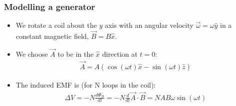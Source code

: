 \documentclass[aspectratio=169,
hyperref={colorlinks,urlcolor=blue}
]{beamer}
\begin{document}




\subsubsection{Modelling a generator}
\label{subsubsec:modellingagenerator}
{
\begin{itemize}
\item<1-> We rotate a coil about the $y$ axis with an angular velocity $\vec\omega=\omega\hat y$ in a constant magnetic field, $\vec B=B\hat x$. 
\item<2-> We choose $\vec A$ to be in the $\hat x$ direction at $t=0$:
\begin{align*}
\vec A = A(\cos(\omega t)\hat x - \sin(\omega t)\hat z)
\end{align*}
\item<3-> The induced EMF is (for N loops in the coil):
\begin{align*}
\Delta V = -N \frac{d\Phi_B}{dt}= -N \frac{d}{dt}\vec A\cdot \vec B=NAB\omega\sin(\omega t)
\end{align*}
\end{itemize}

}
\end{document}
